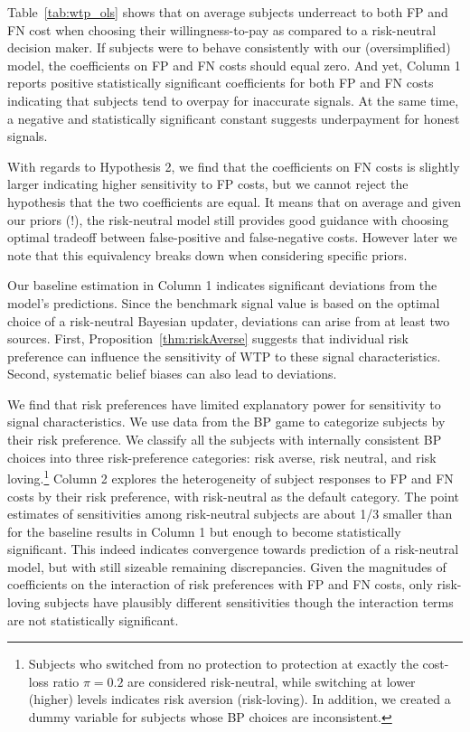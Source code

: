 \documentclass[12pt,a4paper]{article}
\begin{document}
		


Table~\ref{tab:wtp_ols} shows that on average subjects underreact to both FP and FN cost when choosing their willingness-to-pay as compared to a risk-neutral decision maker. If subjects were to behave consistently with our (oversimplified) model, the coefficients on FP and FN costs should equal zero. And yet, Column 1 reports positive statistically significant coefficients for both FP and FN costs indicating that subjects tend to overpay for inaccurate signals. At the same time, a negative and statistically significant constant suggests underpayment for honest signals. 

With regards to Hypothesis 2, we find that the coefficients on FN costs is slightly larger indicating higher sensitivity to FP costs, but we cannot reject the hypothesis that the two coefficients are equal. It means that on average and given our priors (!), the risk-neutral model still provides good guidance with choosing optimal tradeoff between false-positive and false-negative costs. However later we note that this equivalency breaks down when considering specific priors. 

Our baseline estimation in Column 1 indicates significant deviations from the model's predictions. Since the benchmark signal value is based on the optimal choice of a risk-neutral Bayesian updater, deviations can arise from at least two sources. First, Proposition~\ref{thm:riskAverse} suggests that individual risk preference can influence the sensitivity of WTP to these signal characteristics. Second, systematic belief biases can also lead to deviations. 

We find that risk preferences have limited explanatory power for sensitivity to signal characteristics. We use data from the BP game to categorize subjects by their risk preference. We classify all the subjects with internally consistent BP choices into three risk-preference categories: risk averse, risk neutral, and risk loving.\footnote{Subjects who switched from no protection to protection at exactly the cost-loss ratio $\pi=0.2$ are considered risk-neutral, while switching at lower (higher) levels indicates risk aversion (risk-loving). In addition, we created a dummy variable for subjects whose BP choices are inconsistent.}  Column 2 explores the heterogeneity of subject responses to FP and FN costs by their risk preference, with risk-neutral as the default category. The point estimates of sensitivities among risk-neutral subjects are about 1/3 smaller than for the baseline results in Column 1 but enough to become statistically significant. This indeed indicates convergence towards prediction of a risk-neutral model, but with still sizeable remaining discrepancies. Given the magnitudes of coefficients on the interaction of risk preferences with FP and FN costs, only risk-loving subjects have plausibly different sensitivities though the interaction terms are not statistically significant.
\end{document}
